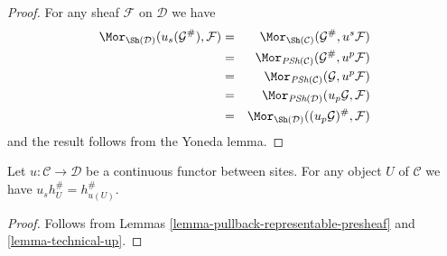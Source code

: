 \begin{proof}
For any sheaf $\mathcal{F}$ on $\mathcal{D}$ we have
\begin{eqnarray*}
\Mor_{\Sh(\mathcal{D})}(u_s(\mathcal{G}^\#), \mathcal{F})
& = &
\Mor_{\Sh(\mathcal{C})}(\mathcal{G}^\#, u^s\mathcal{F}) \\
& = &
\Mor_{\textit{PSh}(\mathcal{C})}(\mathcal{G}^\#, u^p\mathcal{F}) \\
& = &
\Mor_{\textit{PSh}(\mathcal{C})}(\mathcal{G}, u^p\mathcal{F}) \\
& = &
\Mor_{\textit{PSh}(\mathcal{D})}(u_p\mathcal{G}, \mathcal{F}) \\
& = &
\Mor_{\Sh(\mathcal{D})}((u_p\mathcal{G})^\#, \mathcal{F})
\end{eqnarray*}
and the result follows from the Yoneda lemma.
\end{proof}

\begin{lemma}
\label{lemma-pullback-representable-sheaf}
Let $u : \mathcal{C} \to \mathcal{D}$ be a continuous functor
between sites.
For any object $U$ of $\mathcal{C}$ we have $u_sh_U^\# = h_{u(U)}^\#$.
\end{lemma}

\begin{proof}
Follows from
Lemmas \ref{lemma-pullback-representable-presheaf}
and \ref{lemma-technical-up}.
\end{proof}


